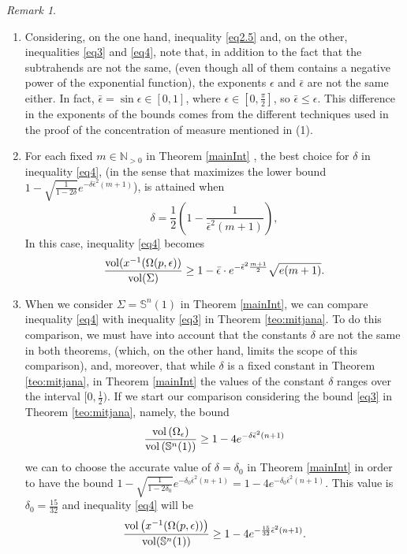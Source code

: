 \documentclass{amsart}
\theoremstyle{definition}
\theoremstyle{remark}
\newtheorem{remark}[theorem]{Remark}
\newcommand{\ese}{\mathbb{S}}
\begin{document}
\begin{remark}
\begin{enumerate}
\item Considering, on the one hand, inequality \eqref{eq2.5} and, on the other, inequalities  \eqref{eq3} and \eqref{eq4}, note that, in addition to the fact that the subtrahends are not the same, (even though all of them contains a negative power of the exponential function), the exponents $\epsilon$ and $\bar\epsilon$ are not the same either.  In fact, $\bar\epsilon=\sin\epsilon \in [0,1]$, where $\epsilon \in [0,\frac{\pi}{2}]$, so $\bar\epsilon \leq \epsilon$.  
This difference in the exponents of the bounds comes from the different techniques used in the proof of the concentration of measure mentioned in (1).
\item For each fixed $m\in \mathbb{N}_{>0}$ in Theorem \ref{mainInt} , the best choice for $\delta$  in inequality \eqref{eq4}, (in the sense that maximizes the lower bound $1- \sqrt{\frac{1}{1-2\delta}}e^{-\delta\bar\epsilon^2(m+1)}$), is attained when
$$ 
\delta=\frac{1}{2}\left(1-\frac{1}{ \bar \epsilon^2 (m+1)}\right),
 $$
\noindent In this case, inequality  \eqref{eq4} becomes
$$
    \frac{{\rm vol}(x^{-1}(\Omega(p,\epsilon))}{{\rm vol}(\Sigma)}\geq 1-\bar \epsilon \cdot e^{-\bar\epsilon^2\frac{m+1}{2}}\sqrt{e(m+1)}.
    $$
    \medskip
\item When we consider $\Sigma=\mathbb{S}^n(1)$ in Theorem \ref{mainInt}, we can compare inequality \eqref{eq4}  with inequality \eqref{eq3} in Theorem \ref{teo:mitjana}. To do this comparison, we must have into account that the constants $\delta$ are not the same in both theorems, (which, on the other hand, limits the scope of this comparison), and, moreover, that while $\delta$ is a fixed constant in Theorem  \ref{teo:mitjana}, in Theorem \ref{mainInt} the values of the constant $\delta$ ranges over the interval $[0,\frac{1}{2})$. If we start our comparison considering the bound  \eqref{eq3} in Theorem \ref{teo:mitjana}, namely, the bound 
$$\frac{{\rm vol}\left(\Omega_\epsilon\right)}{{\rm vol}\left(\mathbb{S}^n(1)\right)}\geq 1-4e^{-\delta\bar\epsilon^2(n+1)}$$
\noindent we can to choose the accurate value of $\delta=\delta_0$ in Theorem  \ref{mainInt} in order to have the bound $1- \sqrt{\frac{1}{1-2\delta_0}}e^{-\delta_0\bar\epsilon^2(n+1)}=1- 4e^{-\delta_0\bar\epsilon^2(n+1)}$. This value is
$
\delta_0=\frac{15}{32}
$ and inequality \eqref{eq4} will be 
$$\frac{{\rm vol}\left(x^{-1}(\Omega(p,\epsilon))\right)}{{\rm vol}(\ese^n(1))}\geq  1- 4e^{-\frac{15}{32}\bar\epsilon^2(n+1)}.$$
\medskip


\end{enumerate}
\end{remark}
\end{document}
